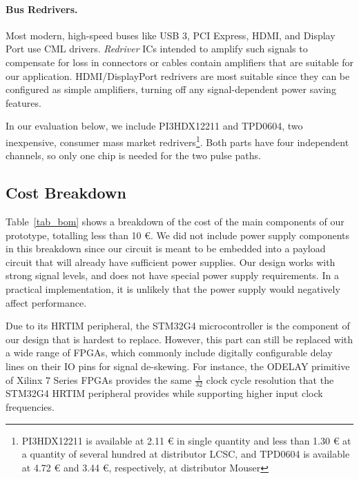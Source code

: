 \documentclass[final]{iacrtrans}
\newcommand{\partno}[1]{\textsf{\small#1}}
\newcommand{\price}[2]{#1 #2}
\begin{document}
\paragraph{Bus Redrivers.}
Most modern, high-speed buses like USB 3, PCI Express, HDMI, and Display Port use CML drivers. \emph{Redriver} ICs
intended to amplify such signals to compensate for loss in connectors or cables contain amplifiers that are suitable for
our application. HDMI/DisplayPort redrivers are most suitable since they can be configured as simple amplifiers,
turning off any signal-dependent power saving features.

In our evaluation below, we include \partno{PI3HDX12211} and \partno{TPD0604}, two inexpensive, consumer mass market
redrivers\footnote{
    \partno{PI3HDX12211} is available at \price{2.11}{\euro} in single quantity and less than \price{1.30}{\euro} at a
    quantity of several hundred at distributor LCSC, and \partno{TPD0604} is available at \price{4.72}{\euro} and
    \price{3.44}{\euro}, respectively, at distributor Mouser}.
Both parts have four independent channels, so only one chip is needed for the two pulse paths.

\subsection{Cost Breakdown}

Table\ \ref{tab_bom} shows a breakdown of the cost of the main components of our prototype, totalling less than
\price{10}{\euro}. We did not include power supply components in this breakdown since our circuit is meant to be
embedded into a payload circuit that will already have sufficient power supplies. Our design works with strong signal
levels, and does not have special power supply requirements. In a practical implementation, it is unlikely that the
power supply would negatively affect performance.

Due to its \partno{HRTIM} peripheral, the \partno{STM32G4} microcontroller is the component of our design that is
hardest to replace. However, this part can still be replaced with a wide range of FPGAs, which commonly include
digitally configurable delay lines on their IO pins for signal de-skewing. For instance, the \partno{ODELAY} primitive
of Xilinx 7 Series FPGAs provides the same $\frac{1}{32}$ clock cycle resolution that the \partno{STM32G4}
\partno{HRTIM} peripheral provides while supporting higher input clock frequencies.
\end{document}
